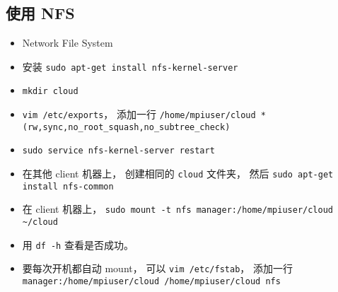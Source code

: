\subsection{使用 NFS}
\begin{itemize}
\item Network File System
\item 安装 \verb|sudo apt-get install nfs-kernel-server|
\item \verb|mkdir cloud|
\item \verb|vim /etc/exports|， 添加一行 \verb|/home/mpiuser/cloud *(rw,sync,no_root_squash,no_subtree_check)|
\item \verb|sudo service nfs-kernel-server restart|
\item 在其他 client 机器上， 创建相同的 \verb|cloud| 文件夹， 然后 \verb|sudo apt-get install nfs-common|
\item 在 client 机器上， \verb|sudo mount -t nfs manager:/home/mpiuser/cloud ~/cloud|
\item 用 \verb|df -h| 查看是否成功。
\item 要每次开机都自动 mount， 可以 \verb|vim /etc/fstab|， 添加一行 \verb|manager:/home/mpiuser/cloud /home/mpiuser/cloud nfs|
\end{itemize}
